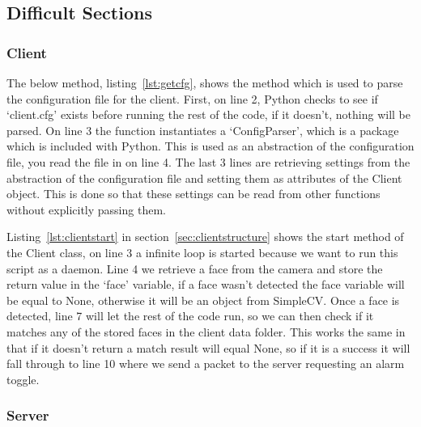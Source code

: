 \documentclass[a4paper]{article}
\begin{document}
    \subsection{Difficult Sections}
        \subsubsection{Client}

        The below method, listing~\ref{lst:getcfg}, shows the method which is used to parse the configuration file for the client. First, on line 2,
        Python checks to see if `client.cfg' exists before running the rest of the code, if it doesn't, nothing will be parsed. On line 3 the function
        instantiates a `ConfigParser', which is a package which is included with Python. This is used as an abstraction of the configuration file, you
        read the file in on line 4. The last 3 lines are retrieving settings from the abstraction of the configuration file and setting them as attributes
        of the Client object. This is done so that these settings can be read from other functions without explicitly passing them.

        \begin{figure}[H]
        
        \end{figure}

        Listing~\ref{lst:clientstart} in section~\ref{sec:clientstructure} shows the start method of the Client class, on line 3 a infinite loop is started because we want to run this script
        as a daemon. Line 4 we retrieve a face from the camera and store the return value in the `face' variable, if a face wasn't detected the face variable
        will be equal to None, otherwise it will be an object from SimpleCV. Once a face is detected, line 7 will let the rest of the code run, so we can then
        check if it matches any of the stored faces in the client data folder. This works the same in that if it doesn't return a match result will equal None,
        so if it is a success it will fall through to line 10 where we send a packet to the server requesting an alarm toggle.

        \subsubsection{Server}
\end{document}
